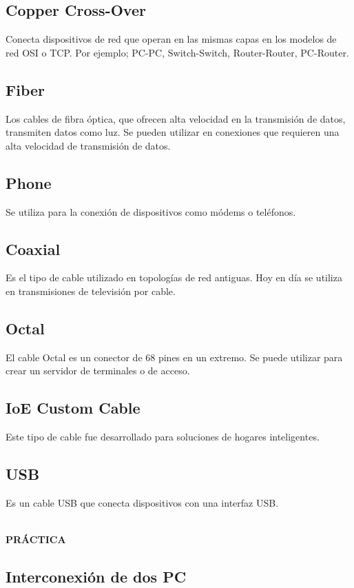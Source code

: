 \documentclass[]{article}
\begin{document}
\subsection{Copper Cross-Over}
Conecta dispositivos de red que operan en las mismas capas en los modelos de red OSI o TCP. Por ejemplo; PC-PC, Switch-Switch, Router-Router, PC-Router.

\subsection{Fiber}
Los cables de fibra óptica, que ofrecen alta velocidad en la transmisión de datos, transmiten datos como luz. Se pueden utilizar en conexiones que requieren una alta velocidad de transmisión de datos.

\subsection{Phone}
Se utiliza para la conexión de dispositivos como módems o teléfonos.

\subsection{Coaxial}
Es el tipo de cable utilizado en topologías de red antiguas. Hoy en día se utiliza en transmisiones de televisión por cable.

\subsection{Octal}
El cable Octal es un conector de 68 pines en un extremo. Se puede utilizar para crear un servidor de terminales o de acceso.

\subsection{IoE Custom Cable}
Este tipo de cable fue desarrollado para soluciones de hogares inteligentes.

\subsection{USB}
Es un cable USB que conecta dispositivos con una interfaz USB.
\\
\\
\begin{center}
	\textbf{{\LARGE PRÁCTICA}}
\end{center}

\begin{center}
	{\tiny \section*{Interconexión de dos PC}}
\end{center}
\end{document}

